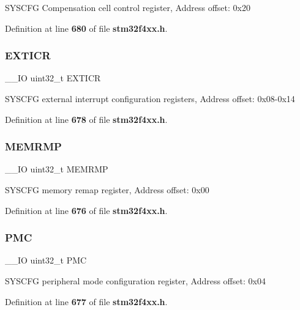 S\+Y\+S\+C\+FG Compensation cell control register, Address offset\+: 0x20 

Definition at line \textbf{ 680} of file \textbf{ stm32f4xx.\+h}.

\mbox{\label{structSYSCFG__TypeDef_af18ed332be387d38ef90cccdfd3f78fc}} 
\subsubsection{E\+X\+T\+I\+CR}
{\footnotesize\ttfamily \+\_\+\+\_\+\+IO uint32\+\_\+t E\+X\+T\+I\+CR}

S\+Y\+S\+C\+FG external interrupt configuration registers, Address offset\+: 0x08-\/0x14 

Definition at line \textbf{ 678} of file \textbf{ stm32f4xx.\+h}.

\mbox{\label{structSYSCFG__TypeDef_ab36c409d0a009e3ce5a89ac55d3ff194}} 
\subsubsection{M\+E\+M\+R\+MP}
{\footnotesize\ttfamily \+\_\+\+\_\+\+IO uint32\+\_\+t M\+E\+M\+R\+MP}

S\+Y\+S\+C\+FG memory remap register, Address offset\+: 0x00 

Definition at line \textbf{ 676} of file \textbf{ stm32f4xx.\+h}.

\mbox{\label{structSYSCFG__TypeDef_a2130abf1fefb63ce4c4b138fd8c9822a}} 
\subsubsection{P\+MC}
{\footnotesize\ttfamily \+\_\+\+\_\+\+IO uint32\+\_\+t P\+MC}

S\+Y\+S\+C\+FG peripheral mode configuration register, Address offset\+: 0x04 

Definition at line \textbf{ 677} of file \textbf{ stm32f4xx.\+h}.

